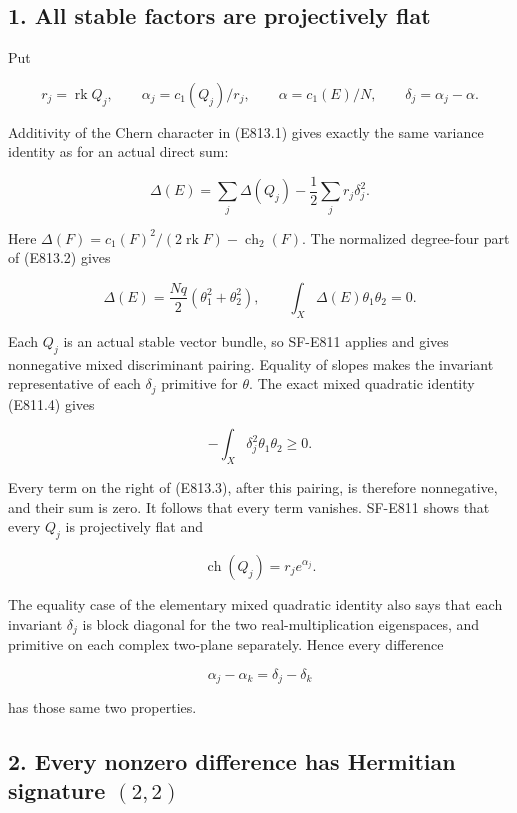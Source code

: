 \subsection{1. All stable factors are projectively
flat}\label{SF-E813-all-stable-factors-are-projectively-flat}

Put

\[
 r_j=\operatorname{rk}Q_j,\qquad
 \alpha_j=c_1(Q_j)/r_j,\qquad
 \alpha=c_1(E)/N,\qquad \delta_j=\alpha_j-\alpha.
\]

Additivity of the Chern character in (E813.1) gives exactly the same
variance identity as for an actual direct sum:

\[
 \Delta(E)=\sum_j\Delta(Q_j)
          -\frac12\sum_jr_j\delta_j^2.
 \tag{E813.3}
\]

Here
\(\Delta(F)=c_1(F)^2/(2\operatorname{rk}F)-\operatorname{ch}_2(F)\). The
normalized degree-four part of (E813.2) gives

\[
 \Delta(E)=\frac{Nq}{2}(\theta_1^2+\theta_2^2),
 \qquad \int_X\Delta(E)\theta_1\theta_2=0.
 \tag{E813.4}
\]

Each \(Q_j\) is an actual stable vector bundle, so SF-E811 applies and
gives nonnegative mixed discriminant pairing. Equality of slopes makes
the invariant representative of each \(\delta_j\) primitive for
\(\theta\). The exact mixed quadratic identity (E811.4) gives

\[
 -\int_X\delta_j^2\theta_1\theta_2\ge0.
\]

Every term on the right of (E813.3), after this pairing, is therefore
nonnegative, and their sum is zero. It follows that every term vanishes.
SF-E811 shows that every \(Q_j\) is projectively flat and

\[
 \operatorname{ch}(Q_j)=r_je^{\alpha_j}.
 \tag{E813.5}
\]

The equality case of the elementary mixed quadratic identity also says
that each invariant \(\delta_j\) is block diagonal for the two
real-multiplication eigenspaces, and primitive on each complex two-plane
separately. Hence every difference

\[
 \alpha_j-\alpha_k=\delta_j-\delta_k
 \tag{E813.6}
\]

has those same two properties.

\subsection{\texorpdfstring{2. Every nonzero difference has Hermitian
signature
\((2,2)\)}{2. Every nonzero difference has Hermitian signature (2,2)}}\label{SF-E813-every-nonzero-difference-has-hermitian-signature-22}

